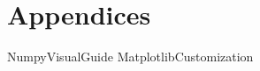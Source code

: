 \documentclass[opener-c,labs,yellow,nociteref]{HJnewsiambook}
\begin{document}
\fi

\part{Appendices}
\begin{appendices}
{NumpyVisualGuide}
{MatplotlibCustomization}
\end{appendices}



\end{document}
